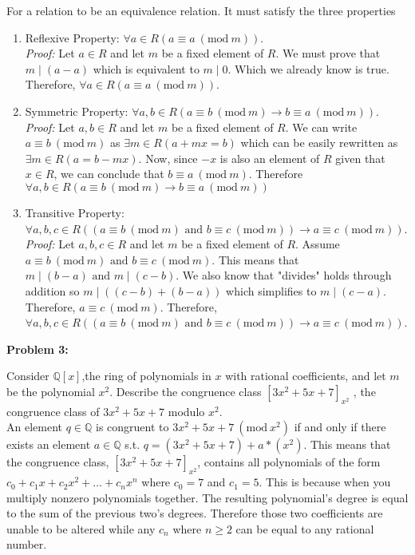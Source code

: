 \documentclass[a4paper, 11pt]{article}
\newcommand{\Mod}[1]{\ (\mathrm{mod}\ #1)}
\begin{document}
    For a relation to be an equivalence relation. It must satisfy the three properties
    \begin{enumerate}
        \item Reflexive Property: $\forall a\in R\left( a \equiv a\Mod{m}\right)$.\\
        
            \textit{Proof:} Let $a\in R$ and let $m$ be a fixed element of $R$. We must prove that $m \mid (a-a)$ which is equivalent to $m\mid 0$. Which we already know is true. Therefore, $\forall a\in R\left( a \equiv a\Mod{m}\right)$.
        \item Symmetric Property: $\forall a,b\in R\left( a\equiv b\Mod{m} \rightarrow b\equiv a \Mod{m}\right)$. \\
        
            \textit{Proof:} Let $a,b\in R$ and let $m$ be a fixed element of $R$. We can write $a\equiv b\Mod{m}$ as $\exists m\in R\left( a+mx=b\right)$ which can be easily rewritten as $\exists m\in R\left( a=b-mx\right)$. Now, since $-x$ is also an element of $R$ given that $x\in R$, we can conclude that $b\equiv a\Mod{m}$. Therefore $\forall a,b\in R\left( a\equiv b\Mod{m} \rightarrow b\equiv a \Mod{m}\right)$
        \item Transitive Property: $\forall a,b,c\in R\left(\left( a\equiv b\Mod{m} \text{ and }  b\equiv c\Mod{m}\right) \rightarrow  a\equiv c\Mod{m}\right)$. \\
        
            \textit{Proof:} Let $a,b,c\in R$ and let $m$ be a fixed element of $R$. Assume $a\equiv b\Mod{m} \text{ and }  b\equiv c\Mod{m}$. This means that $m \mid (b-a) \text{ and } m\mid (c-b)$. We also know that "divides" holds through addition so $m \mid \left(\left(c-b\right) +\left(b-a\right)\right)$ which simplifies to $m \mid (c-a)$. Therefore, $a\equiv c \Mod{m}$. Therefore, $\forall a,b,c\in R\left(\left( a\equiv b\Mod{m} \text{ and }  b\equiv c\Mod{m}\right) \rightarrow  a\equiv c\Mod{m}\right)$. 
    \end{enumerate}
\newpage

\noindent\textbf{Problem 3:}

    Consider $\mathbb{Q}[x]$,the ring of polynomials in $x$ with rational coefficients, and let $m$ be the polynomial $x^2$. Describe the congruence class $[3x^2 + 5x + 7]_{x^2}$ , the congruence class of $3x^2 + 5x + 7$ modulo $x^2$. \\
    
    An element $q\in \mathbb{Q}$ is congruent to $3x^2 + 5x + 7 \Mod{x^2}$ if and only if there exists an element $a\in\mathbb{Q}$ s.t. $q = (3x^2 + 5x + 7) + a*(x^2)$. This means that the congruence class, $[3x^2 + 5x + 7]_{x^2}$, contains all polynomials of the form $c_0+c_1x+c_2x^2 + \dots + c_nx^n $ where $c_0 = 7$ and $c_1 = 5$. This is because when you multiply nonzero polynomials together. The resulting polynomial's degree is equal to the sum of the previous two's degrees. Therefore those two coefficients are unable to be altered while any $c_n$ where $n\geq 2$ can be equal to any rational number.
\end{document}
